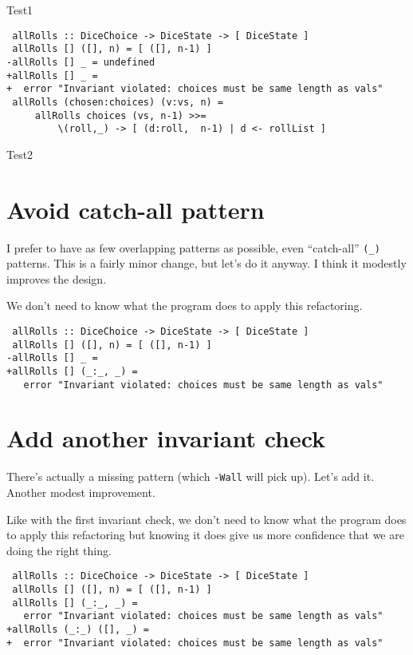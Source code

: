 {Test1}
{ 
\begin{verbatim}
 allRolls :: DiceChoice -> DiceState -> [ DiceState ]
 allRolls [] ([], n) = [ ([], n-1) ]
-allRolls [] _ = undefined
+allRolls [] _ =
+  error "Invariant violated: choices must be same length as vals"
 allRolls (chosen:choices) (v:vs, n) =
     allRolls choices (vs, n-1) >>=
         \(roll,_) -> [ (d:roll,  n-1) | d <- rollList ]
\end{verbatim}
}
{Test2}


\section{Avoid catch-all pattern}

I prefer to have as few overlapping patterns as possible, even ``catch-all'' \texttt{(\_)} patterns. This is a fairly minor change, but let's do it anyway. I think it modestly improves the design.

We don't need to know what the program does to apply this refactoring.

\begin{verbatim}
 allRolls :: DiceChoice -> DiceState -> [ DiceState ]
 allRolls [] ([], n) = [ ([], n-1) ]
-allRolls [] _ =
+allRolls [] (_:_, _) =
   error "Invariant violated: choices must be same length as vals"
\end{verbatim}

\section{Add another invariant check}

There's actually a missing pattern (which \texttt{-Wall} will pick up). Let's add it. Another modest improvement.

Like with the first invariant check, we don't need to know what the program does to apply this refactoring but knowing it does give us more confidence that we are doing the right thing.

\begin{verbatim}
 allRolls :: DiceChoice -> DiceState -> [ DiceState ]
 allRolls [] ([], n) = [ ([], n-1) ]
 allRolls [] (_:_, _) =
   error "Invariant violated: choices must be same length as vals"
+allRolls (_:_) ([], _) =
+  error "Invariant violated: choices must be same length as vals"
\end{verbatim}

